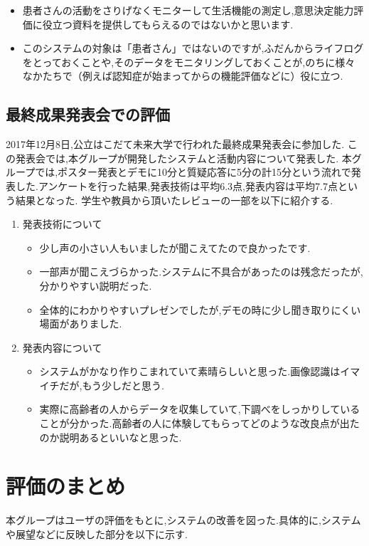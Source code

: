 \documentclass[../report]{subfiles}
\begin{document}
\begin{itemize}
    \item 患者さんの活動をさりげなくモニターして生活機能の測定し,意思決定能力評価に役立つ資料を提供してもらえるのではないかと思います.
    \item このシステムの対象は「患者さん」ではないのですが,ふだんからライフログをとっておくことや,そのデータをモニタリングしておくことが,のちに様々なかたちで（例えば認知症が始まってからの機能評価などに）役に立つ.
\end{itemize}

\subsection{最終成果発表会での評価}
2017年12月8日,公立はこだて未来大学で行われた最終成果発表会に参加した.
この発表会では,本グループが開発したシステムと活動内容について発表した.
本グループでは,ポスター発表とデモに10分と質疑応答に5分の計15分という流れで発表した.アンケートを行った結果,発表技術は平均6.3点,発表内容は平均7.7点という結果となった.
学生や教員から頂いたレビューの一部を以下に紹介する.

\begin{enumerate}
    \item[] 発表技術について
\begin{itemize}
    \item 少し声の小さい人もいましたが聞こえてたので良かったです.
    \item 一部声が聞こえづらかった.システムに不具合があったのは残念だったが,分かりやすい説明だった.
    \item 全体的にわかりやすいプレゼンでしたが,デモの時に少し聞き取りにくい場面がありました.
\end{itemize}

    \item[] 発表内容について
\begin{itemize}
    \item システムがかなり作りこまれていて素晴らしいと思った.画像認識はイマイチだが,もう少しだと思う.
    \item 実際に高齢者の人からデータを収集していて,下調べをしっかりしていることが分かった.高齢者の人に体験してもらってどのような改良点が出たのか説明あるといいなと思った.
\end{itemize}
\end{enumerate}

\section{評価のまとめ}
本グループはユーザの評価をもとに,システムの改善を図った.具体的に,システムや展望などに反映した部分を以下に示す.
\end{document}
